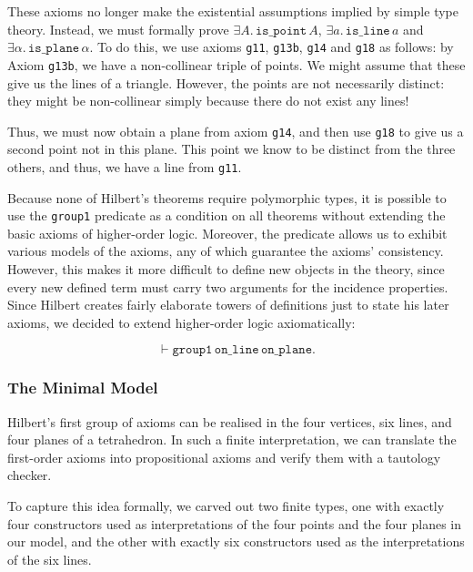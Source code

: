 \documentclass{article}
\begin{document}
These axioms no longer make the existential assumptions implied by simple type theory. Instead, we must formally prove $\exists A.\,\texttt{is\_point}\,A$, $\exists a.\,\texttt{is\_line}\,a$ and $\exists \alpha.\,\texttt{is\_plane}\,\alpha$. To do this, we use axioms \texttt{g11}, \texttt{g13b}, \texttt{g14} and \texttt{g18} as follows: by Axiom \texttt{g13b}, we have a non-collinear triple of points. We might assume that these give us the lines of a triangle. However, the points are not necessarily distinct: they might be non-collinear simply because there do not exist any lines!

Thus, we must now obtain a plane from axiom \texttt{g14}, and then use \texttt{g18} to give us a second point not in this plane. This point we know to be distinct from the three others, and thus, we have a line from \texttt{g11}.

Because none of Hilbert's theorems require polymorphic types, it is possible to use the \texttt{group1} predicate as a condition on all theorems without extending the basic axioms of higher-order logic. Moreover, the predicate allows us to exhibit various models of the axioms, any of which guarantee the axioms' consistency. However, this makes it more difficult to define new objects in the theory, since every new defined term must carry two arguments for the incidence properties. Since Hilbert creates fairly elaborate towers of definitions just to state his later axioms, we decided to extend higher-order logic axiomatically:

\begin{displaymath}
\vdash \texttt{group1}\,\texttt{on\_line}\,\texttt{on\_plane}.
\end{displaymath}

\subsubsection{The Minimal Model}\label{sec:GroupIModels}
Hilbert's first group of axioms can be realised in the four vertices, six lines, and four planes of a tetrahedron. In such a finite interpretation, we can translate the first-order axioms into propositional axioms and verify them with a tautology checker.

To capture this idea formally, we carved out two finite types, one with exactly four constructors used as interpretations of the four points and the four planes in our model, and the other with exactly six constructors used as the interpretations of the six lines.
\end{document}
